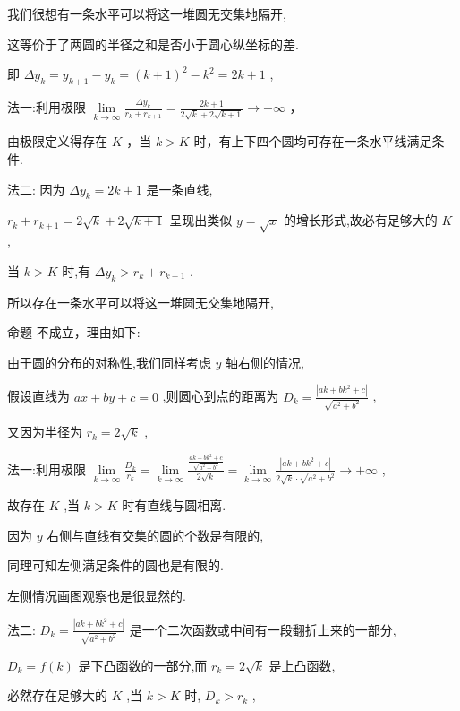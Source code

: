 \documentclass[10pt]{article}
\newcommand*\circled[1]{\tikz[baseline=(char.base)]{\node[shape=circle,draw,inner sep=1.5pt] (char) {\small #1};}}
\begin{document}
我们很想有一条水平可以将这一堆圆无交集地隔开,

这等价于了两圆的半径之和是否小于圆心纵坐标的差.

即 \(\Delta {y}_{k} = {y}_{k + 1} - {y}_{k} = {\left( k + 1\right) }^{2} - {k}^{2} = {2k} + 1\) ,

法一:利用极限 \(\mathop{\lim }\limits_{{k \rightarrow  \infty }}\frac{\Delta {y}_{k}}{{r}_{k} + {r}_{k + 1}} = \frac{{2k} + 1}{2\sqrt{k} + 2\sqrt{k + 1}} \rightarrow   + \infty\) ，

由极限定义得存在 \(K\) ，当 \(k > K\) 时，有上下四个圆均可存在一条水平线满足条件.

法二: 因为 \(\Delta {y}_{k} = {2k} + 1\) 是一条直线,

\({r}_{k} + {r}_{k + 1} = 2\sqrt{k} + 2\sqrt{k + 1}\) 呈现出类似 \(y = \sqrt{x}\) 的增长形式,故必有足够大的 \(K\) ,

当 \(k > K\) 时,有 \(\Delta {y}_{k} > {r}_{k} + {r}_{k + 1}\) .

所以存在一条水平可以将这一堆圆无交集地隔开,

命题 \circled{2} 不成立，理由如下:

由于圆的分布的对称性,我们同样考虑 \(y\) 轴右侧的情况,

假设直线为 \({ax} + {by} + c = 0\) ,则圆心到点的距离为 \({D}_{k} = \frac{\left| ak + b{k}^{2} + c\right| }{\sqrt{{a}^{2} + {b}^{2}}}\) ,

又因为半径为 \({r}_{k} = 2\sqrt{k}\) ,

法一:利用极限 \(\mathop{\lim }\limits_{{k \rightarrow  \infty }}\frac{{D}_{k}}{{r}_{k}} = \mathop{\lim }\limits_{{k \rightarrow  \infty }}\frac{\frac{{ak} + b{k}^{2} + c}{\sqrt{{a}^{2} + {b}^{2}}}}{2\sqrt{k}} = \mathop{\lim }\limits_{{k \rightarrow  \infty }}\frac{\left| ak + b{k}^{2} + c\right| }{2\sqrt{k} \cdot  \sqrt{{a}^{2} + {b}^{2}}} \rightarrow   + \infty\) ,

故存在 \(K\) ,当 \(k > K\) 时有直线与圆相离.

因为 \(y\) 右侧与直线有交集的圆的个数是有限的,

同理可知左侧满足条件的圆也是有限的.

左侧情况画图观察也是很显然的.

法二: \({D}_{k} = \frac{\left| ak + b{k}^{2} + c\right| }{\sqrt{{a}^{2} + {b}^{2}}}\) 是一个二次函数或中间有一段翻折上来的一部分,

\({D}_{k} = f\left( k\right)\) 是下凸函数的一部分,而 \({r}_{k} = 2\sqrt{k}\) 是上凸函数,

必然存在足够大的 \(K\) ,当 \(k > K\) 时, \({D}_{k} > {r}_{k}\) ,
\end{document}
